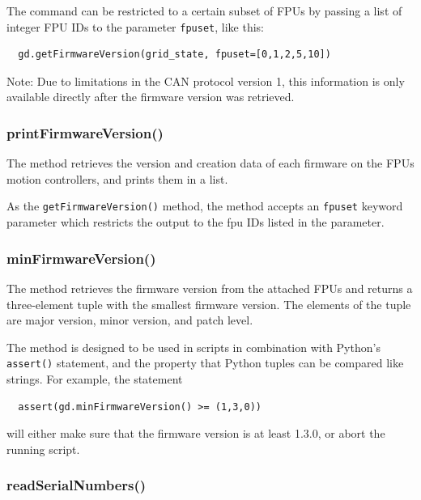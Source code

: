 \documentclass[11pt,a4paper]{scrartcl}
\begin{document}
The command can be restricted to a certain subset of FPUs
by passing a list of integer FPU IDs to the parameter
\texttt{fpuset}, like this:
  
\begin{verbatim}
  gd.getFirmwareVersion(grid_state, fpuset=[0,1,2,5,10])
\end{verbatim}

Note: Due to limitations in the CAN protocol version 1, this
information is only available directly after the firmware version was
retrieved.


\subsubsection{printFirmwareVersion()}
\label{sec:printfirmwareversion}

The method retrieves the version and creation data of each firmware on
the FPUs motion controllers, and prints them in a list.

As the \texttt{getFirmwareVersion()} method, the method accepts an
\texttt{fpuset} keyword parameter which restricts the output to the fpu IDs
listed in the parameter.

\subsubsection{minFirmwareVersion()}
\label{sec:minfirmwareversion}
The method retrieves the firmware version from the attached FPUs and
returns a three-element tuple with the smallest firmware version.  The
elements of the tuple are major version, minor version, and patch
level.

The method is designed to be used in scripts in combination with
Python's \texttt{assert()} statement, and the property that Python
tuples can be compared like strings. For example, the statement
\begin{verbatim}
  assert(gd.minFirmwareVersion() >= (1,3,0))
\end{verbatim}
will either make sure that the firmware version is at least 1.3.0, or
abort the running script.

\subsubsection{readSerialNumbers()}
\end{document}
